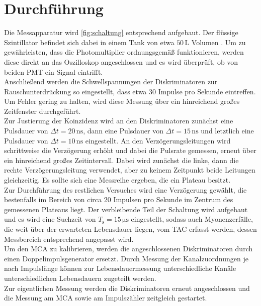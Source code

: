 \section{Durchführung}
\label{sec:Durchführung}

Die Messapparatur wird \autoref{fig:schaltung} entsprechend aufgebaut.
Der flüssige Szintillator befindet sich dabei in einem Tank von etwa $50 \,\unit{\liter}$ Volumen \cite{ap03}.
Um zu gewährleisten, dass die Photomultiplier ordnungsgemäß funktionieren, werden diese direkt an das Oszilloskop angeschlossen und es wird überprüft, ob von beiden PMT ein Signal eintrifft. \\

Anschließend werden die Schwellspannungen der Diskriminatoren zur Rauschunterdrückung so eingestellt, dass etwa $30$ Impulse pro Sekunde eintreffen.
Um Fehler gering zu halten, wird diese Messung über ein hinreichend großes Zeitfenster durchgeführt. \\

Zur Justierung der Koinzidenz wird an den Diskriminatoren zunächst eine Pulsdauer von $\Delta t = 20 \,\unit{\nano\second}$, dann eine Pulsdauer von $\Delta t = 15 \,\unit{\nano\second}$ und letztlich eine
Pulsdauer von $\Delta t = 10 \,\unit{\nano\second}$ eingestellt.
An den Verzögerungsleitungen wird schrittweise die Verzögerung erhöht und dabei die Pulsrate gemessen, erneut über ein hinreichend großes Zeitintervall.
Dabei wird zunächst die linke, dann die rechte Verzögerungsleitung verwendet, aber zu keinem Zeitpunkt beide Leitungen gleichzeitig.
Es sollte sich eine Messreihe ergeben, die ein Plateau besitzt. \\

Zur Durchführung des restlichen Versuches wird eine Verzögerung gewählt, die bestenfalls im Bereich von circa $20$ Impulsen pro Sekunde im Zentrum des gemessenen Plateaus liegt.
Der verbleibende Teil der Schaltung wird aufgebaut und es wird eine Suchzeit von $T_\text{s} = 15 \,\unit{\micro\second}$ eingestellt, sodass auch Myonenzerfälle, die weit über der erwarteten Lebensdauer
liegen, vom TAC erfasst werden, dessen Messbereich entsprechend angepasst wird. \\

Um den MCA zu kalibrieren, werden die angeschlossenen Diskriminatoren durch einen Doppelimpulsgenerator ersetzt.
Durch Messung der Kanalzuordnungen je nach Impulslänge können zur Lebensdauermessung unterschiedliche Kanäle unterschiedlichen Lebensdauern zugeteilt werden. \\

Zur eigentlichen Messung werden die Diskriminatoren erneut angeschlossen und die Messung am MCA sowie am Impulszähler zeitgleich gestartet.




